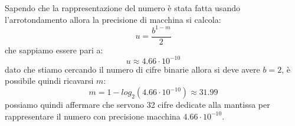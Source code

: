 Sapendo che la rappresentazione del numero è stata fatta usando l'arrotondamento allora la precisione di macchina si calcola:
\[
u = \frac{b^{1-m}}{2}
\]
che sappiamo essere pari a:
\[
u \approx 4.66 \cdot 10^{-10}
\]
dato che stiamo cercando il numero di cifre binarie allora si deve avere $b=2$, è possibile quindi ricavarsi $m$:
\[
m = 1- log_2{(4.66 \cdot 10 ^{-10})} \approx 31.99
\]
possiamo quindi affermare che servono 32 cifre dedicate alla mantissa per rappresentare il numero con precisione macchina \(4.66 \cdot 10^{-10}\).